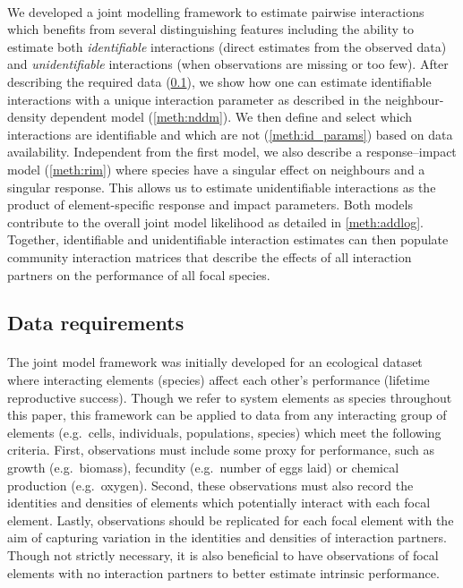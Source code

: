 \documentclass[a4,12pt]{article}
\begin{document}
\begin{refsection}
\paragraph{} 
We developed a joint modelling framework to estimate pairwise interactions which benefits from several distinguishing features including the ability to estimate both \textit{identifiable} interactions (direct estimates from the observed data) and \textit{unidentifiable} interactions (when observations are missing or too few). After describing the required data (\ref{meth:data}), we show how one can estimate identifiable interactions with a unique interaction parameter as described in the neighbour-density dependent model (\ref{meth:nddm}). We then define and select which interactions are identifiable and which are not (\ref{meth:id_params}) based on data availability. Independent from the first model, we also describe a response--impact model (\ref{meth:rim}) where species have a singular effect on neighbours and a singular response. This allows us to estimate unidentifiable interactions as the product of element-specific response and impact parameters. Both models contribute to the overall joint model likelihood as detailed in \ref{meth:addlog}. Together, identifiable and unidentifiable interaction estimates can then populate community interaction matrices that describe the effects of all interaction partners on the performance of all focal species. 


    \subsection{Data requirements}
    \label{meth:data}

    \paragraph{}
    The joint model framework was initially developed for an ecological dataset where interacting elements (species) affect each other's performance (lifetime reproductive success). Though we refer to system elements as species throughout this paper, this framework can be applied to data from any interacting group of elements (e.g.\ cells, individuals, populations, species) which meet the following criteria. First, observations must include some proxy for performance, such as growth (e.g.\ biomass), fecundity (e.g.\ number of eggs laid) or chemical production (e.g.\ oxygen). Second, these observations must also record the identities and densities of elements which potentially interact with each focal element. Lastly, observations should be replicated for each focal element with the aim of capturing variation in the identities and densities of interaction partners. Though not strictly necessary, it is also beneficial to have observations of focal elements with no interaction partners to better estimate intrinsic performance. 


\end{refsection}
\end{document}
